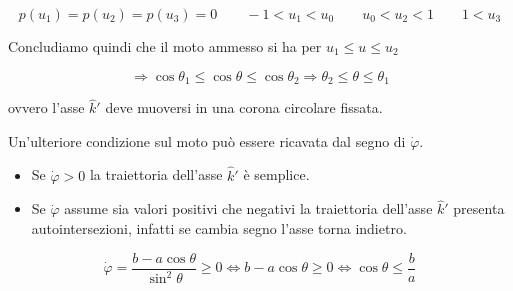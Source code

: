 \[
p(u_1)=p(u_2)=p(u_3)=0
\qquad
-1<u_1<u_0
\qquad
u_0<u_2<1
\qquad
1<u_3
\]

\begin{center}
\end{center}

Concludiamo quindi che il moto ammesso si ha per \(u_1\leq u\leq u_2\)

\[
\Rightarrow
\cos\theta_1\leq\cos\theta\leq\cos\theta_2
\Rightarrow
\theta_2\leq\theta\leq\theta_1
\]

ovvero l'asse \(\hat{k}'\) deve muoversi in una corona circolare fissata.

Un'ulteriore condizione sul moto può essere ricavata dal segno di \(\dot{\varphi}\).

\begin{itemize}
  \item Se \(\dot{\varphi}>0\) la traiettoria dell'asse \(\hat{k}'\) è semplice.
  \item Se \(\dot{\varphi}\) assume sia valori positivi che negativi la traiettoria dell'asse \(\hat{k}'\) presenta autointersezioni, infatti se cambia segno l'asse torna indietro.
\end{itemize}

\[
\dot{\varphi}=\frac{b-a\cos\theta}{\sin^2\theta}\geq 0
\iff
b-a\cos\theta\geq 0
\iff
\cos\theta\leq \frac{b}{a}
\]

